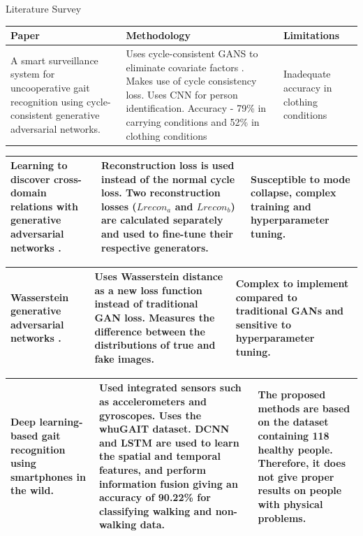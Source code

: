 \documentclass[xcolor=dvipsnames]{beamer}
\begin{document}
\begin{frame}{Literature Survey}
\begin{table}
  \centering
  
  \tiny
  \begin{tabular}{|p{3cm}|p{5cm}|p{3cm}|} 
    \hline
    Paper & Methodology & Limitations \\
    \hline
    A smart surveillance system for uncooperative gait recognition using cycle-consistent generative adversarial networks\cite{alsaggaf2021}.
    & 
    Uses cycle-consistent GANS to eliminate covariate factors .
    Makes use of cycle consistency loss.
    Uses CNN for person identification.
    Accuracy - 79\% in carrying conditions and 52\% in clothing conditions & 
    Inadequate accuracy in clothing conditions
    \\

    \hline
  \end{tabular}


   \begin{tabular}{|p{3cm}|p{5cm}|p{3cm}|}
    Learning to discover
    cross-domain relations with generative adversarial networks \cite{kim2017}. &
    Reconstruction loss is used instead of the normal cycle loss. 
    Two reconstruction losses ($Lrecon_{a}$ and $Lrecon_{b}$) are calculated separately and used to fine-tune their respective generators. &
    Susceptible to mode collapse, complex training and hyperparameter tuning.\\
    \hline
  \end{tabular}


   \begin{tabular}{|p{3cm}|p{5cm}|p{3cm}|}
    Wasserstein generative adversarial networks \cite{arjovsky2017}.&
    Uses Wasserstein distance as a new loss function instead of traditional GAN loss.
    Measures the difference between the distributions of true and fake images. &
    Complex to implement compared to traditional GANs and
    sensitive to hyperparameter tuning.\\
    \hline
  \end{tabular}


  \begin{tabular}{|p{3cm}|p{5cm}|p{3cm}|}
    Deep learning-based gait recognition using smartphones in the wild\cite{zou2020}.&
    Used integrated sensors such as accelerometers and gyroscopes. Uses the whuGAIT dataset. DCNN and LSTM are used to learn the spatial and temporal features, and perform information fusion giving an accuracy of 90.22\% for classifying walking and non-walking data.&
    The proposed methods are based on the dataset containing 118 healthy people. Therefore, it does not give proper results on people with physical problems.\\
    \hline
    

\end{tabular}
\end{table}
\end{frame}
\end{document}
